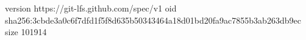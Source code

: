 version https://git-lfs.github.com/spec/v1
oid sha256:3cbde3a0c6f7dfd1f5f8d635b50343464a18d01bd20fa9ac7855b3ab263db9ec
size 101914
